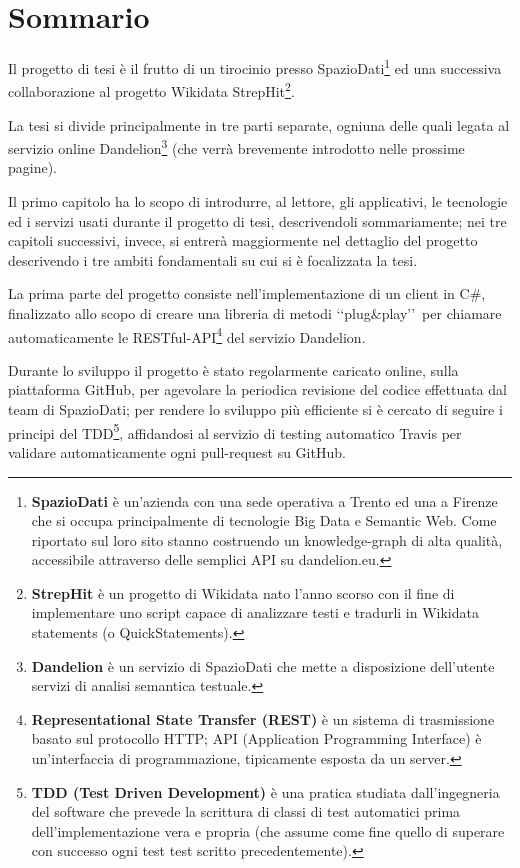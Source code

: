 \chapter*{Sommario} %
\label{sommario}

Il progetto di tesi è il frutto di un tirocinio presso SpazioDati\footnote{
    \textbf{SpazioDati} è un'azienda con una sede operativa a Trento ed una a Firenze che si occupa principalmente di tecnologie Big Data e Semantic Web.
    Come riportato sul loro sito\cite{spaziodati} stanno costruendo un knowledge-graph di alta qualità, accessibile attraverso delle semplici API 
    su dandelion.eu\cite{dandelion}.
}
ed una successiva collaborazione al progetto Wikidata StrepHit\footnote{
    \textbf{StrepHit} è un progetto di Wikidata\cite{wikidata} nato l'anno scorso con il fine di implementare uno script\cite{strephit} 
    capace di analizzare testi e tradurli in Wikidata statements (o QuickStatements\cite{quickstatements}). 
}. 

La tesi si divide principalmente in tre parti separate, ogniuna delle quali legata al servizio online Dandelion\footnote{
    \textbf{Dandelion} è un servizio di SpazioDati che mette a disposizione dell'utente servizi di analisi semantica testuale.
} (che verrà brevemente introdotto nelle prossime pagine). 

Il primo capitolo ha lo scopo di introdurre, al lettore, gli applicativi, le tecnologie ed i servizi usati durante il progetto di tesi, descrivendoli sommariamente; 
nei tre capitoli successivi, invece, si entrerà maggiormente nel dettaglio del progetto descrivendo i tre ambiti fondamentali su cui si è focalizzata la tesi.

La prima parte del progetto consiste nell'implementazione di un client in C$\#$, finalizzato allo scopo di creare una libreria di metodi \lq\lq plug$\&$play\rq\rq\ 
per chiamare automaticamente le RESTful-API\footnote{
    \textbf{Representational State Transfer (REST)}\cite{rest} è un sistema di trasmissione basato sul protocollo HTTP; API (Application Programming Interface\cite{api}) è
    un'interfaccia di programmazione, tipicamente esposta da un server.
} del servizio Dandelion. 

Durante lo sviluppo il progetto è stato regolarmente caricato online, sulla piattaforma GitHub\cite{github}, per agevolare la periodica revisione del codice effettuata dal team di SpazioDati; 
per rendere lo sviluppo più efficiente si è cercato di seguire i principi del TDD\footnote{
        \textbf{TDD (Test Driven Development)}\cite{tdd} è una pratica studiata dall'ingegneria del software che prevede la 
        scrittura di classi di test automatici prima dell'implementazione vera e propria (che assume come fine 
        quello di superare con successo ogni test test scritto precedentemente).    
}, affidandosi al servizio di testing automatico Travis\cite{travis} per validare automaticamente ogni pull-request su GitHub. 

